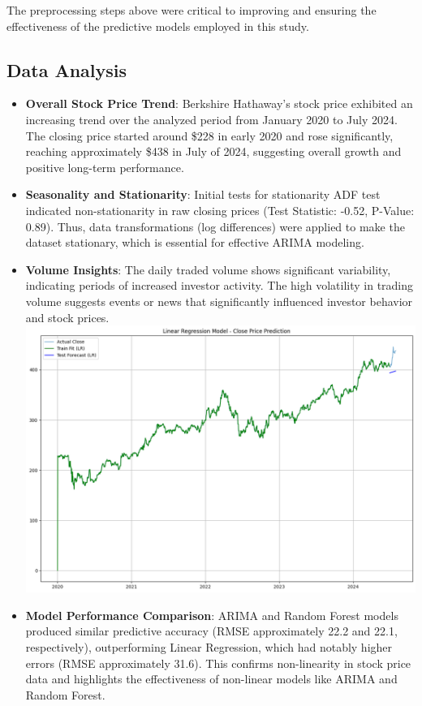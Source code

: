 \documentclass[conference]{IEEEtran}
\begin{document}
The preprocessing steps above were critical to improving and ensuring the effectiveness of the predictive models employed in this study.

\subsection{Data Analysis}\label{AA}
\begin{itemize}
    \item \textbf{Overall Stock Price Trend}: Berkshire Hathaway's stock price exhibited an increasing trend over the analyzed period from January 2020 to July 2024. The closing price started around \$228 in early 2020 and rose significantly, reaching approximately \$438 in July of 2024, suggesting overall growth and positive long-term performance.
    \item \textbf{Seasonality and Stationarity}: Initial tests for stationarity ADF test indicated non-stationarity in raw closing prices (Test Statistic: -0.52, P-Value: 0.89). Thus, data transformations (log differences) were applied to make the dataset stationary, which is essential for effective ARIMA modeling.
    \item \textbf{Volume Insights}: The daily traded volume shows significant variability, indicating periods of increased investor activity. The high volatility in trading volume suggests events or news that significantly influenced investor behavior and stock prices.
     \includegraphics[scale=0.25]{screenshots/linreg.png} %
    \item \textbf{Model Performance Comparison}: ARIMA and Random Forest models produced similar predictive accuracy (RMSE approximately 22.2 and 22.1, respectively), outperforming Linear Regression, which had notably higher errors (RMSE approximately 31.6). This confirms non-linearity in stock price data and highlights the effectiveness of non-linear models like ARIMA and Random Forest.

\end{itemize}
\end{document}
